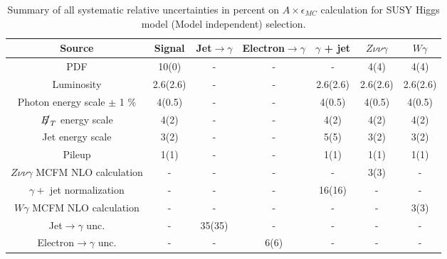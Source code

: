 \begin{table}[htbp]
\scriptsize
\centering
\begin{tabular}{|c|c|c|c|c|c|c|}
\hline
Source   & Signal & Jet$\rightarrow \gamma$ & Electron$\rightarrow \gamma$ & $\gamma$ + jet & $Z\nu\nu\gamma$ & $W\gamma$ \\
\hline
PDF & 10(0) & - & - & - & 4(4) & 4(4) \\
\hline
Luminosity & 2.6(2.6) & - & - & 2.6(2.6) & 2.6(2.6) & 2.6(2.6) \\
\hline
Photon energy scale $\pm$ 1 $\%$  & 4(0.5) & - & - & 4(0.5) & 4(0.5) & 4(0.5) \\
\hline
$\met$ energy scale & 4(2) & - & - & 4(2) & 4(2) & 4(2) \\
\hline
Jet energy scale & 3(2) & - & - & 5(5) & 3(2) & 3(2) \\
\hline
Pileup  &  1(1) & - & - & 1(1) & 1(1) & 1(1) \\
\hline
$Z\nu\nu\gamma$ MCFM NLO calculation & - & - & - & - & 3(3) & - \\
\hline
$\gamma +$ jet normalization  & - & - & - & 16(16) & - & - \\
\hline
$W\gamma$ MCFM NLO calculation & - & - & - & - & - & 3(3) \\
\hline
Jet$\rightarrow \gamma$ unc.   & - & 35(35) & - & - & - & - \\
\hline
Electron$\rightarrow \gamma$ unc.   & - & - & 6(6) & - & - & - \\
\hline
\end{tabular}
\caption{Summary of all systematic relative uncertainties in percent on $A\times \epsilon_{MC}$ calculation for SUSY Higgs model (Model independent) selection. }
\label{tab:sys}
\end{table}

